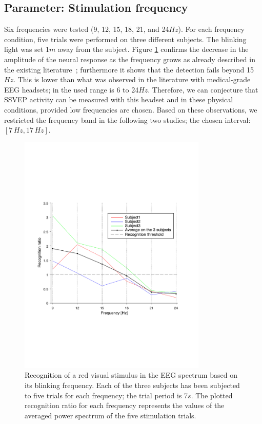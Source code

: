 \documentclass[smallextended]{svjour3}
\begin{document}
\subsection{Parameter: Stimulation frequency}
Six frequencies were tested (9, 12, 15, 18, 21, and 24$Hz$). For each frequency condition, five trials were performed on three different subjects. The blinking light was set 1$m$ away from the subject. Figure \ref{fig:graph-frequences} confirms the decrease in the amplitude of the neural response as the frequency grows as already described in the existing literature~\cite{herrmann2001}; furthermore it shows that the detection fails beyond 15$Hz$. This is lower than what was observed in the literature with medical-grade EEG headsets; in \cite{SSVEPfiability} the used range is 6 to 24$Hz$. Therefore, we can conjecture that SSVEP activity can be measured with this headset and in these physical conditions, provided low frequencies are chosen. Based on these observations, we restricted the frequency band in the following two studies; the chosen interval: $[7\,\mathit{Hz}, 17\,\mathit{Hz}]$.

\begin{figure}
\center
\includegraphics[width=0.8\textwidth]{figures/graph-frequences.pdf}
\caption{Recognition of a red visual stimulus in the EEG spectrum based on its blinking frequency. Each of the three subjects has been subjected to five trials for each frequency; the trial period is 7$s$. The plotted recognition ratio for each frequency represents the values of the averaged power spectrum of the five stimulation trials.} \label{fig:graph-frequences}
\end{figure}
\end{document}
